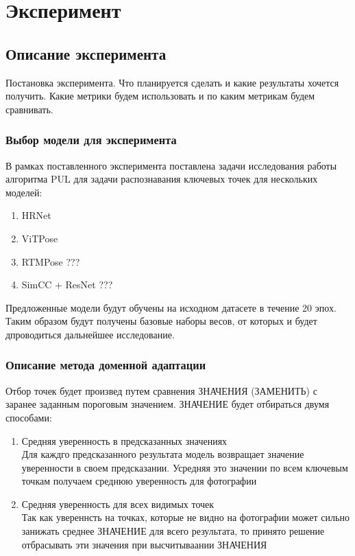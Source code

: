 \section{Эксперимент}
\label{sec:Chapter5} 

\subsection{Описание эксперимента}

Постановка эксперимента. Что планируется сделать и какие результаты хочется получить. Какие метрики будем использовать и по каким метрикам будем сравнивать.

\subsubsection*{Выбор модели для эксперимента}

В рамках поставленного эксперимента поставлена задачи исследования работы алгоритма PUL для задачи распознавания ключевых точек для нескольких моделей:
\begin{enumerate}
\item HRNet
\item ViTPose
\item RTMPose ???
\item SimCC + ResNet ???
\end{enumerate}

Предложенные модели будут обучены на исходном датасете в течение 20 эпох. Таким образом будут получены базовые наборы весов, от которых и будет дпроводиться дальнейшее исследование.

\subsubsection*{Описание метода доменной адаптации}
Отбор точек будет произвед путем сравнения ЗНАЧЕНИЯ (ЗАМЕНИТЬ) с заранее заданным пороговым значением. ЗНАЧЕНИЕ будет отбираться двумя способами:
\begin{enumerate}
\item Средняя уверенность в предсказанных значениях\\
Для каждго предсказанного результата модель возвращает значение уверенности в своем предсказании. Усредняя это значении по всем ключевым точкам получаем среднюю уверенность для фотографии
\item Средняя уверенность для всех видимых точек\\
Так как увереннсть на точках, которые не видно на фотографии может сильно занижать среднее ЗНАЧЕНИЕ для всего результата, то принято решение отбрасывать эти значения при высчитываании ЗНАЧЕНИЯ
\end{enumerate}

